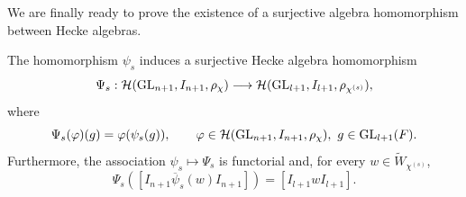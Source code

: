     We are finally ready to prove the existence of a surjective algebra homomorphism between Hecke algebras.
    \iffalse
    \begin{proposition}
        The homomorphism $\psi_s$ induces a surjective Hecke algebra homomorphism 
        \begin{equation*}
            \Psi_s:\mathcal{H}(\mathrm{GL}_{n+1},I_{n+1},\rho_\chi)\longrightarrow\mathcal{H}(\mathrm{GL}_{l+1},I_{l+1},\rho_{\chi^{(s)}}),
        \end{equation*}
        where
        $$\Psi_s(\varphi)(g)=\varphi(\psi_s(g)),\quad\quad \varphi\in\mathcal{H}(\mathrm{GL}_{n+1},I_{n+1},\rho_\chi),\ g\in\mathrm{GL}_{l+1}(F).$$
        Furthermore, the association $\psi_s\mapsto\Psi_s$ is functorial and, for every $w\in\widetilde{W}_{\chi^{(s)}}$,
        $$\Psi_s([I_{n+1}\overline{\psi}_s(w)I_{n+1}])=[I_{l+1}wI_{l+1}].$$
    \end{proposition}
